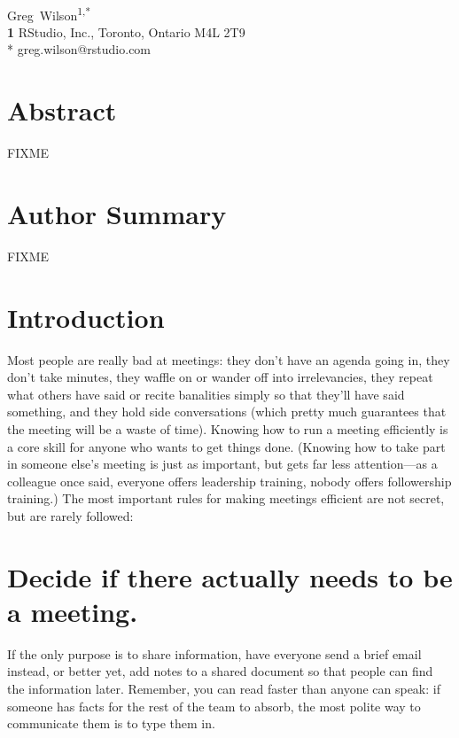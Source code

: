 \documentclass[10pt,letterpaper]{article}
\newcommand{\rulemajor}[1]{\section{#1}}
\begin{document}
\vspace*{0.2in}

\begin{flushleft}
{\Large
\textbf{}
}
\newline
\\
{Greg~Wilson}\textsuperscript{1,*}
\\
\textbf{1} RStudio, Inc., Toronto, Ontario M4L 2T9
\\
\bigskip
* greg.wilson@rstudio.com
\end{flushleft}

\section*{Abstract}

FIXME

\section*{Author Summary}

FIXME

\section*{Introduction}

Most people are really bad at meetings: they don't have an agenda going in, they
don't take minutes, they waffle on or wander off into irrelevancies, they repeat
what others have said or recite banalities simply so that they'll have said
something, and they hold side conversations (which pretty much guarantees that
the meeting will be a waste of time).  Knowing how to run a meeting efficiently
is a core skill for anyone who wants to get things done. (Knowing how to take
part in someone else's meeting is just as important, but gets far less
attention—as a colleague once said, everyone offers leadership training, nobody
offers followership training.) The most important rules for making meetings
efficient are not secret, but are rarely followed:

\rulemajor{Decide if there actually needs to be a meeting.}

If the only purpose is to share information, have everyone send a brief email
instead, or better yet, add notes to a shared document so that people can find
the information later. Remember, you can read faster than anyone can speak: if
someone has facts for the rest of the team to absorb, the most polite way to
communicate them is to type them in.
\end{document}
